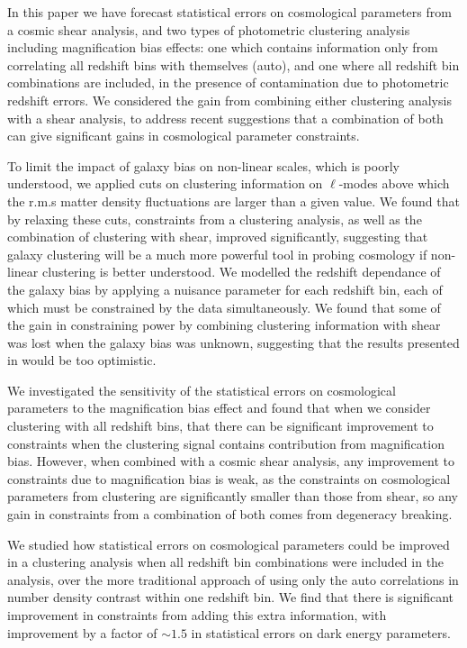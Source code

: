 \documentclass[useAMS,usenatbib,times,letter,amssymb]{mn2e}
\begin{document}
In this paper we have forecast statistical errors on cosmological parameters from a cosmic shear analysis, and two types of photometric clustering analysis including magnification bias effects: one which contains information only from correlating all redshift bins with themselves (auto), and one where all redshift bin combinations are included, in the presence of contamination due to photometric redshift errors. We considered the gain from combining either clustering analysis with a shear analysis, to address recent suggestions that a combination of both can give significant gains in cosmological parameter constraints. %

To limit the impact of galaxy bias on non-linear scales, which is poorly understood, we applied cuts on clustering information on $\ell$-modes above which the r.m.s matter density fluctuations are larger than a given value. We found that by relaxing these cuts, constraints from a clustering analysis, as well as the combination of clustering with shear, improved significantly, suggesting that galaxy clustering will be a much more powerful tool in probing cosmology if non-linear clustering is better understood. We modelled the redshift dependance of the galaxy bias by applying a nuisance parameter for each redshift bin, each of which must be constrained by the data simultaneously. We found that some of the gain in constraining power by combining clustering information with shear was lost when the galaxy bias was unknown, suggesting that the results presented in \cite{VanWaerbeke:2010p8} would be too optimistic.

We investigated the sensitivity of the statistical errors on cosmological parameters to the magnification bias effect and found that when we consider clustering with all redshift bins, that there can be significant improvement to constraints when the clustering signal contains contribution from magnification bias. However, when combined with a cosmic shear analysis, any improvement to constraints due to magnification bias is weak, as the constraints on cosmological parameters from clustering are significantly smaller than those from shear, so any gain in constraints from a combination of both comes from degeneracy breaking.

We studied how statistical errors on cosmological parameters could be improved in a clustering analysis when all redshift bin combinations were included in the analysis, over the more traditional approach of using only the auto correlations in number density contrast within one redshift bin. We find that there is significant improvement in constraints from adding this extra information, with improvement by a factor of $\sim 1.5$ in statistical errors on dark energy parameters.
\end{document}
